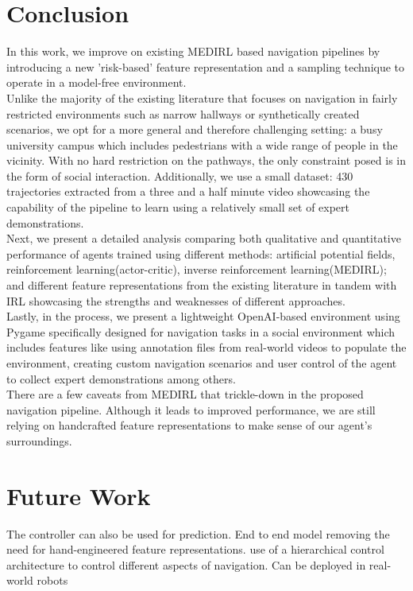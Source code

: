 
\section{Conclusion}
In this work, we improve on existing MEDIRL based navigation pipelines by introducing a new 'risk-based' feature representation and a sampling technique to operate in a model-free environment. \\
Unlike the majority of the existing literature that focuses on navigation in fairly restricted environments such as narrow hallways or synthetically created scenarios, we opt for a more general and therefore challenging setting: a busy university campus which includes pedestrians with a wide range of people in the vicinity. With no hard restriction on the pathways, the only constraint posed is in the form of social interaction. Additionally, we use a small dataset: 430 trajectories extracted from a three and a half minute video showcasing the capability of the pipeline to learn using a relatively small set of expert demonstrations.\\
Next, we present a detailed analysis comparing both qualitative and quantitative performance of agents trained using different methods: artificial potential fields, reinforcement learning(actor-critic), inverse reinforcement learning(MEDIRL); and different feature representations from the existing literature in tandem with IRL showcasing the strengths and weaknesses of different approaches.\\
Lastly, in the process, we present a lightweight OpenAI-based environment using Pygame specifically designed for navigation tasks in a social environment which includes features like using annotation files from real-world videos to populate the environment, creating custom navigation scenarios and user control of the agent to collect expert demonstrations among others. \\
There are a few caveats from MEDIRL that trickle-down in the proposed navigation pipeline. Although it leads to improved performance, we are still relying on handcrafted feature representations to make sense of our agent's surroundings. \\

\section{Future Work}
The controller can also be used for prediction.
End to end model removing the need for hand-engineered feature representations.
use of a hierarchical control architecture to control different aspects of navigation.
Can be deployed in real-world robots